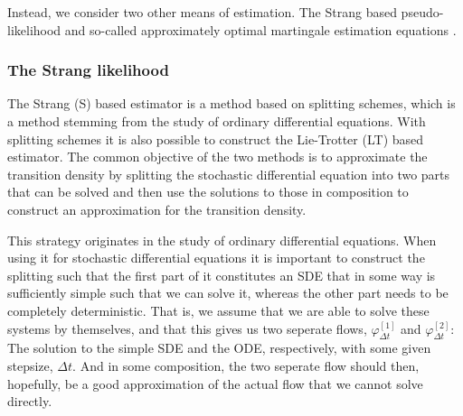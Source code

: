Instead, we consider two other means of estimation. The Strang based pseudo-likelihood \cite{SplittingSchemes} and so-called approximately optimal martingale estimation equations \cite{StatisticalMethodsForSDE}.
\subsubsection{The Strang likelihood}
The Strang (S) based estimator is a method based on splitting schemes, which is a method stemming from the study of ordinary differential equations. With splitting schemes it is also possible to construct the Lie-Trotter (LT) based estimator. The common objective of the two methods is to approximate the transition density by splitting the stochastic differential equation into two parts that can be solved and then use the solutions to those in composition to construct an approximation for the transition density.

This strategy originates in the study of ordinary differential equations. When using it for stochastic differential equations it is important to construct the splitting such that the first part of it constitutes an SDE that in some way is sufficiently simple such that we can solve it, whereas the other part needs to be completely deterministic. That is, we assume that we are able to solve these systems by themselves, and that this gives us two seperate flows, $\varphi_{\Delta t}^{[1]}$ and $\varphi_{\Delta t}^{[2]}$: The solution to the simple SDE and the ODE, respectively, with some given stepsize, $\Delta t$. And in some composition, the two seperate flow should then, hopefully, be a good approximation of the actual flow that we cannot solve directly.

